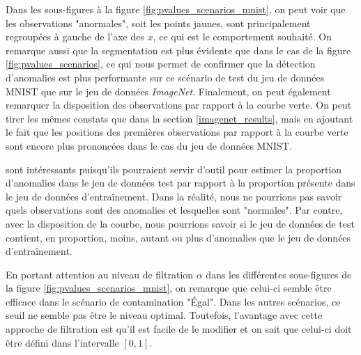 Dans les \DIFdelbegin {}\DIFdelend \DIFaddbegin {}\DIFaddend sous-figures à la figure \ref{fig:pvalues_scenarios_mnist}, on peut voir que les observations "anormales", soit les points jaunes, sont principalement regroupées à gauche de l'axe des $x$, ce qui est le comportement souhaité. On remarque aussi que la segmentation est plus évidente que dans le cas de la figure \ref{fig:pvalues_scenarios}, ce qui nous permet de confirmer que la détection d'anomalies est plus performante sur ce scénario de test du jeu de données MNIST que sur le jeu de données \textit{ImageNet}. Finalement, on peut également remarquer la disposition des observations par rapport à la courbe verte. On peut tirer les mêmes constats que dans la section \ref{imagenet_results}, mais en ajoutant le fait que les positions des premières observations par rapport à la courbe verte sont encore plus prononcées dans le cas du jeu de données MNIST. 
\DIFdelbegin {}\DIFdelend \DIFaddbegin 

\DIFaddend sont intéressants puisqu'ils pourraient servir d'outil pour estimer la proportion d'anomalies dans le jeu de données test par rapport à la proportion présente dans le jeu de données d'entraînement. Dans la réalité, nous ne pourrions pas savoir quels observations sont des anomalies et lesquelles sont "normales". Par contre, avec la disposition de la courbe, nous pourrions savoir si le jeu de données de test contient, en proportion, moins, autant ou plus d'anomalies que le jeu de données d'entraînement. \DIFaddbegin {}\DIFaddend 

En portant attention au niveau de filtration $\alpha$ dans les \DIFdelbegin {}\DIFdelend \DIFaddbegin {}\DIFaddend différentes sous-figures de la figure \ref{fig:pvalues_scenarios_mnist}, on remarque que celui-ci semble être efficace dans le scénario de contamination "Égal". Dans les \DIFdelbegin {}\DIFdelend \DIFaddbegin {}\DIFaddend autres scénarios, ce seuil ne semble pas être le niveau optimal. Toutefois, l'avantage avec cette approche de filtration est qu'il est facile de le modifier et on sait que celui-ci doit être défini dans l'intervalle $[0, 1]$.

